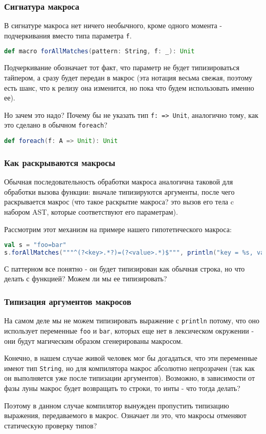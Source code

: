 \documentclass[hyperref={bookmarks=false}]{beamer}
\begin{document}
\begin{frame}[t,fragile]
\frametitle{Сигнатура макроса}

В сигнатуре макроса нет ничего необычного, кроме одного момента - подчеркивания вместо типа параметра \texttt{f}.

\begin{lstlisting}[language=scala]
def macro forAllMatches(pattern: String, f: _): Unit
\end{lstlisting}

Подчеркивание обозначает тот факт, что параметр не будет типизироваться тайпером, а сразу будет передан в макрос (эта нотация весьма свежая, поэтому есть шанс, что к релизу она изменится, но пока что будем использовать именно ее).

Но зачем это надо? Почему бы не указать тип \texttt{f: => Unit}, аналогично тому, как это сделано в обычном \texttt{foreach}?

\begin{lstlisting}[language=scala]
def foreach(f: A => Unit): Unit
\end{lstlisting}
\end{frame}

\begin{frame}[t,fragile]
\frametitle{Как раскрываются макросы}

Обычная последовательность обработки макроса аналогична таковой для обработки вызова функции: вначале типизируются аргументы, после чего раскрывается макрос (что такое раскрытие макроса? это вызов его тела c набором AST, которые соответствуют его параметрам).

Рассмотрим этот механизм на примере нашего гипотетического макроса:

\begin{lstlisting}[language=scala]
val s = "foo=bar"
s.forAllMatches("""^(?<key>.*?)=(?<value>.*)$""", println("key = %s, value = %s".format(key, value)))
\end{lstlisting}%

С паттерном все понятно - он будет типизирован как обычная строка, но что делать с функцией? Можем ли мы ее типизировать?
\end{frame}

\begin{frame}[t,fragile]
\frametitle{Типизация аргументов макросов}

На самом деле мы не можем типизировать выражение с \texttt{println} потому, что оно использует переменные \texttt{foo} и \texttt{bar}, которых еще нет в лексическом окружении - они будут магическим образом сгенерированы макросом.

Конечно, в нашем случае живой человек мог бы догадаться, что эти переменные имеют тип \texttt{String}, но для компилятора макрос абсолютно непрозрачен (так как он выполняется уже после типизации аргументов). Возможно, в зависимости от фазы луны макрос будет возвращать то строки, то инты  - что тогда делать?

Поэтому в данном случае компилятор вынужден пропустить типизацию выражения, передаваемого в макрос. Означает ли это, что макросы отменяют статическую проверку типов?
\end{frame}
\end{document}
